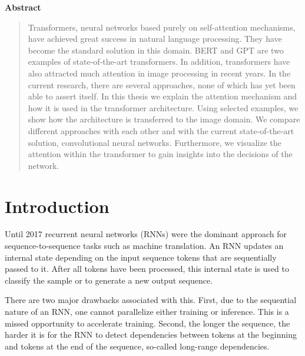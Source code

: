 \documentclass[a4paper]{scrartcl}
\let\stdsection\section
\renewcommand\section{\newpage\stdsection}
\begin{document}
    

    \newpage
    \begin{center}
        \Large
        \textbf{Abstract}
    \end{center}
    \begin{abstract}
        Transformers, neural networks based purely on self-attention mechanisms, have achieved great success in natural language processing.
        They have become the standard solution in this domain.
        BERT and GPT are two examples of state-of-the-art transformers.
        In addition, transformers have also attracted much attention in image processing in recent years.
        In the current research, there are several approaches, none of which has yet been able to assert itself.
        In this thesis we explain the attention mechanism and how it is used in the transformer architecture.
        Using selected examples, we show how the architecture is transferred to the image domain.
        We compare different approaches with each other and with the current state-of-the-art solution, convolutional neural networks.
        Furthermore, we visualize the attention within the transformer to gain insights into the decisions of the network.
    \end{abstract}

    \newpage
    \tableofcontents

    \newpage
    \listoffigures

    \newpage
    \listoftables


    \newpage


    \section{Introduction}\label{sec:introduction}
    Until 2017 recurrent neural networks (RNNs) were the dominant approach for sequence-to-sequence tasks such as machine translation.
    An RNN updates an internal state depending on the input sequence tokens that are sequentially passed to it.
    After all tokens have been processed, this internal state is used to classify the sample or to generate a new output sequence.

    There are two major drawbacks associated with this.
    First, due to the sequential nature of an RNN, one cannot parallelize either training or inference.
    This is a missed opportunity to accelerate training.
    Second, the longer the sequence, the harder it is for the RNN to detect dependencies between tokens at the beginning and tokens at the end of the sequence, so-called long-range dependencies.
\end{document}

